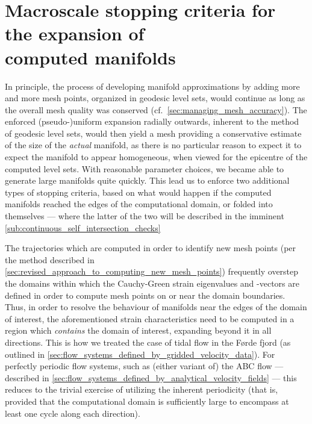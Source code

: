 \section[Macroscale stopping criteria for the expansion of computed manifolds]
{Macroscale stopping criteria for the expansion of \\\phantom{3.10} computed manifolds}
\label{sec:macroscale_stopping_criteria_for_the_expansion_of_computed_manifolds}

In principle, the process of developing manifold approximations by adding more
and more mesh points, organized in geodesic level sets, would continue as long
as the overall mesh quality was conserved (cf.\
\cref{sec:managing_mesh_accuracy}). The enforced (pseudo-)uniform expansion
radially outwards, inherent to the method of geodesic level sets, would then
yield a mesh providing a conservative estimate of the size of the
\emph{actual} manifold, as there is no particular reason to expect it to
expect the manifold to appear homogeneous, when viewed for the epicentre
of the computed level sets. With reasonable parameter choices, we became
able to generate large manifolds quite quickly. This lead us to enforce two
additional types of stopping criteria, based on what would happen if the
computed manifolds reached the edges of the computational domain, or folded
into themselves --- where the latter of the two will be described in the
imminent \cref{sub:continuous_self_intersection_checks}

The trajectories which are computed in order to identify new mesh points
(per the method described in
\cref{sec:revised_approach_to_computing_new_mesh_points}) frequently overstep
the domains within which the Cauchy-Green strain eigenvalues and -vectors
are defined in order to compute mesh points on or near the domain
boundaries. Thus, in order to resolve the behaviour of manifolds near the
edges of the domain of interest, the aforementioned strain characteristics
need to be computed in a region which \emph{contains} the domain of interest,
expanding beyond it in all directions. This is how we treated the case of
tidal flow in the Førde fjord (as outlined in
\cref{sec:flow_systems_defined_by_gridded_velocity_data}). For perfectly
periodic flow systems, such  as (either variant of) the ABC flow --- described
in \cref{sec:flow_systems_defined_by_analytical_velocity_fields} --- this
reduces to the trivial exercise of utilizing the inherent periodicity
(that is, provided that the computational domain is sufficiently large
to encompass at least one cycle along each direction).

